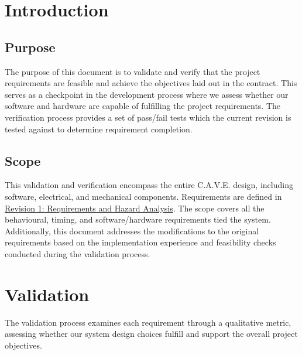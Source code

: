 \documentclass[11pt]{article}
\begin{document}
	{
		\tableofcontents
		\listoffigures
		\listoftables
	}
	
	\cleardoublepage
	\renewcommand{\thetable}{\arabic{table}}
	\setcounter{table}{0}
	
	\section{Introduction}
	\subsection{Purpose}
	
	The purpose of this document is to validate and verify that the project requirements are feasible and achieve the objectives laid out in the contract. This serves as a checkpoint in the development process where we assess whether our software and hardware are capable of fulfilling the project requirements. The verification process provides a set of pass/fail tests which the current revision is tested against to determine requirement completion.
	
	\subsection{Scope}
	This validation and verification encompass the entire C.A.V.E. design, including software, electrical, and mechanical components. Requirements are defined in \href{https://github.com/4tb6-cave/capstone/blob/main/docs/HazardAnalysis/HazardAnalysis.pdf}{Revision 1: Requirements and Hazard Analysis}. The scope covers all the behavioural, timing, and software/hardware requirements tied the system. Additionally, this document addresses the modifications to the original requirements based on the implementation experience and feasibility checks conducted during the validation process.
	
	\section{Validation} 
	
	The validation process examines each requirement through a qualitative metric, assessing whether our system design choices fulfill and support the overall project objectives.
	
\end{document}
